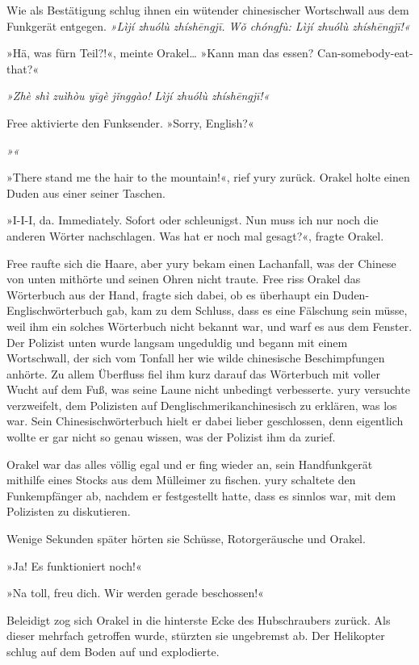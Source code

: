 Wie als Bestätigung schlug ihnen ein wütender chinesischer Wortschwall aus dem Funkgerät entgegen. \textit{»Lìjí zhuólù zhíshēngjī. Wǒ chóngfù: Lìjí zhuólù zhíshēngjī!«}

»Hä, was fürn Teil?!«, meinte Orakel… »Kann man das essen? Can-somebody-eat-that?«

\textit{»Zhè shì zuìhòu yīgè jǐnggào! Lìjí zhuólù zhíshēngjī!«}

Free aktivierte den Funksender. »Sorry, English?«

\textit{»«}

»There stand me the hair to the mountain!«, rief yury zurück. Orakel holte einen Duden aus einer seiner Taschen.

»I-I-I, da. Immediately. Sofort oder schleunigst. Nun muss ich nur noch die anderen Wörter nachschlagen. Was hat er noch mal gesagt?«, fragte Orakel.

Free raufte sich die Haare, aber yury bekam einen Lachanfall, was der Chinese von unten mithörte und seinen Ohren nicht traute. Free riss Orakel das Wörterbuch aus der Hand, fragte sich dabei, ob es überhaupt ein Duden-Englischwörterbuch gab, kam zu dem Schluss, dass es eine Fälschung sein müsse, weil ihm ein solches Wörterbuch nicht bekannt war, und warf es aus dem Fenster. Der Polizist unten wurde langsam ungeduldig und begann mit einem Wortschwall, der sich vom Tonfall her wie wilde chinesische Beschimpfungen anhörte. Zu allem Überfluss fiel ihm kurz darauf das Wörterbuch mit voller Wucht auf dem Fuß, was seine Laune nicht unbedingt verbesserte. yury versuchte verzweifelt, dem Polizisten auf Denglischmerikanchinesisch zu erklären, was los war. Sein Chinesischwörterbuch hielt er dabei lieber geschlossen, denn eigentlich wollte er gar nicht so genau wissen, was der Polizist ihm da zurief.

Orakel war das alles völlig egal und er fing wieder an, sein Handfunkgerät mithilfe eines Stocks aus dem Mülleimer zu fischen. yury schaltete den Funkempfänger ab, nachdem er festgestellt hatte, dass es sinnlos war, mit dem Polizisten zu diskutieren.

Wenige Sekunden später hörten sie Schüsse, Rotorgeräusche und Orakel.

»Ja! Es funktioniert noch!«

»Na toll, freu dich. Wir werden gerade beschossen!«

Beleidigt zog sich Orakel in die hinterste Ecke des Hubschraubers zurück. Als dieser mehrfach getroffen wurde, stürzten sie ungebremst ab. Der Helikopter schlug auf dem Boden auf und explodierte.


